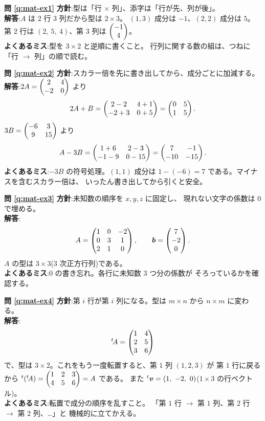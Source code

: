 \bigskip
\noindent\textbf{問 \ref{q:mat-ex1}}\quad
\textbf{方針}:型は「行 $\times$ 列」、添字は「行が先、列が後」。\\
\textbf{解答}:$A$ は $2$ 行 $3$ 列だから型は $2 \times 3$。
$(1,3)$ 成分は $-1$、$(2,2)$ 成分は $5$。
第 $2$ 行は $(2,\ 5,\ 4)$、第 $3$ 列は $\begin{pmatrix}-1 \\ 4\end{pmatrix}$。\\
\textbf{よくあるミス}:型を $3 \times 2$ と逆順に書くこと。
行列に関する数の組は、つねに「行 $\to$ 列」の順で読む。

\bigskip
\noindent\textbf{問 \ref{q:mat-ex2}}\quad
\textbf{方針}:スカラー倍を先に書き出してから、成分ごとに加減する。\\
\textbf{解答}:$2A = \begin{pmatrix}2 & 4 \\ -2 & 0\end{pmatrix}$ より
\[
2A + B = \begin{pmatrix}2 - 2 & 4 + 1 \\ -2 + 3 & 0 + 5\end{pmatrix} = \begin{pmatrix}0 & 5 \\ 1 & 5\end{pmatrix}.
\]
$3B = \begin{pmatrix}-6 & 3 \\ 9 & 15\end{pmatrix}$ より
\[
A - 3B = \begin{pmatrix}1 + 6 & 2 - 3 \\ -1 - 9 & 0 - 15\end{pmatrix} = \begin{pmatrix}7 & -1 \\ -10 & -15\end{pmatrix}.
\]
\textbf{よくあるミス}:$-3B$ の符号処理。$(1,1)$ 成分は
$1 - (-6) = 7$ である。マイナスを含むスカラー倍は、
いったん書き出してから引くと安全。

\bigskip
\noindent\textbf{問 \ref{q:mat-ex3}}\quad
\textbf{方針}:未知数の順序を $x, y, z$ に固定し、
現れない文字の係数は $0$ で埋める。\\
\textbf{解答}:
\[
A = \begin{pmatrix}1 & 0 & -2 \\ 0 & 3 & 1 \\ 2 & 1 & 0\end{pmatrix}, \qquad
\bm{b} = \begin{pmatrix}7 \\ -2 \\ 0\end{pmatrix}.
\]
$A$ の型は $3 \times 3$($3$ 次正方行列)である。\\
\textbf{よくあるミス}:$0$ の書き忘れ。各行に未知数 $3$ つ分の係数が
そろっているかを確認する。

\bigskip
\noindent\textbf{問 \ref{q:mat-ex4}}\quad
\textbf{方針}:第 $i$ 行が第 $i$ 列になる。型は $m \times n$ から
$n \times m$ に変わる。\\
\textbf{解答}:
\[
{}^t\!A = \begin{pmatrix}1 & 4 \\ 2 & 5 \\ 3 & 6\end{pmatrix}
\]
で、型は $3 \times 2$。これをもう一度転置すると、第 $1$ 列 $(1, 2, 3)$ が
第 $1$ 行に戻るから
${}^t({}^t\!A) = \begin{pmatrix}1 & 2 & 3 \\ 4 & 5 & 6\end{pmatrix} = A$ である。
また ${}^t\vect{v} = (1,\ -2,\ 0)$($1 \times 3$ の行ベクトル)。\\
\textbf{よくあるミス}:転置で成分の順序を乱すこと。
「第 $1$ 行 $\to$ 第 $1$ 列、第 $2$ 行 $\to$ 第 $2$ 列、…」と
機械的に立てかえる。

